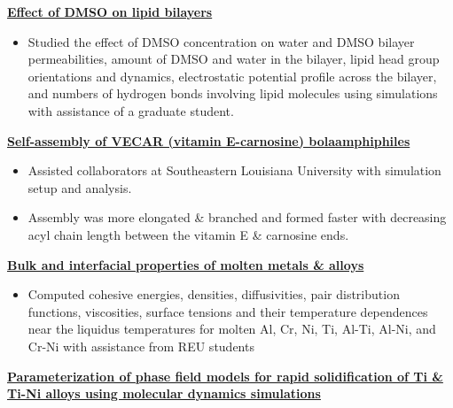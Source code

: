 \begin{cventries}
{\begin{cvitems}
\begin{itemize}
                \end{itemize}            
            \item {\textbf{\underline{Effect of DMSO on lipid bilayers}}}
                \vspace{2pt}
                \begin{itemize}
                    \item Studied the effect of DMSO concentration on water and DMSO bilayer permeabilities, amount of DMSO and water in the bilayer, lipid head group orientations and dynamics, electrostatic potential profile across the bilayer, and numbers of hydrogen bonds involving lipid molecules using simulations with assistance of a graduate student.
                \end{itemize}
            \item {\textbf{\underline{Self-assembly of VECAR (vitamin E-carnosine) bolaamphiphiles}}}
                \vspace{2pt}
                \begin{itemize}
                \item {Assisted collaborators at Southeastern Louisiana University with simulation setup and analysis.}
                \item{Assembly was more elongated \& branched and formed faster with decreasing acyl chain length between the vitamin E \& carnosine ends.}
                \end{itemize}
            \item {\textbf{\underline{Bulk and interfacial properties of molten metals \& alloys}}}
                \vspace{2pt}
                \begin{itemize}
                    \item Computed cohesive energies, densities, diffusivities, pair distribution functions, viscosities, surface tensions and their temperature dependences near the liquidus temperatures for molten Al, Cr, Ni, Ti, Al-Ti, Al-Ni, and Cr-Ni with assistance from REU students
                \end{itemize}
            \item {\textbf{\underline{Parameterization of phase field models for rapid solidification of Ti \& Ti-Ni alloys using molecular dynamics simulations}}}

\end{cvitems}}
\end{cventries}
